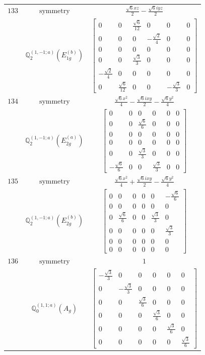 \documentclass[fleqn,8pt,landscape]{jsarticle}
\begin{document}
\begin{longtable}{ccc}
$ 133 $ & $ \text{symmetry} $ & $ \frac{\sqrt{6} x z}{2} - \frac{\sqrt{6} i y z}{2} $ \\
$  $ & $ \mathbb{Q}_{2}^{(1,-1;a)}(E_{1g}^{(b)}) $ & $ \begin{bmatrix} 0 & 0 & \frac{\sqrt{6}}{12} & 0 & 0 & 0 \\ 0 & 0 & 0 & - \frac{\sqrt{2}}{4} & 0 & 0 \\ 0 & 0 & 0 & 0 & 0 & 0 \\ 0 & 0 & \frac{\sqrt{3}}{3} & 0 & 0 & 0 \\ - \frac{\sqrt{2}}{4} & 0 & 0 & 0 & 0 & 0 \\ 0 & \frac{\sqrt{6}}{12} & 0 & 0 & - \frac{\sqrt{3}}{3} & 0 \end{bmatrix} $ \\ \hline
$ 134 $ & $ \text{symmetry} $ & $ \frac{\sqrt{6} x^{2}}{4} - \frac{\sqrt{6} i x y}{2} - \frac{\sqrt{6} y^{2}}{4} $ \\
$  $ & $ \mathbb{Q}_{2}^{(1,-1;a)}(E_{2g}^{(a)}) $ & $ \begin{bmatrix} 0 & 0 & 0 & 0 & 0 & 0 \\ 0 & 0 & \frac{\sqrt{6}}{6} & 0 & 0 & 0 \\ 0 & 0 & 0 & 0 & 0 & 0 \\ 0 & 0 & 0 & 0 & 0 & 0 \\ 0 & 0 & \frac{\sqrt{3}}{3} & 0 & 0 & 0 \\ - \frac{\sqrt{6}}{6} & 0 & 0 & \frac{\sqrt{3}}{3} & 0 & 0 \end{bmatrix} $ \\ \hline
$ 135 $ & $ \text{symmetry} $ & $ \frac{\sqrt{6} x^{2}}{4} + \frac{\sqrt{6} i x y}{2} - \frac{\sqrt{6} y^{2}}{4} $ \\
$  $ & $ \mathbb{Q}_{2}^{(1,-1;a)}(E_{2g}^{(b)}) $ & $ \begin{bmatrix} 0 & 0 & 0 & 0 & 0 & - \frac{\sqrt{6}}{6} \\ 0 & 0 & 0 & 0 & 0 & 0 \\ 0 & \frac{\sqrt{6}}{6} & 0 & 0 & \frac{\sqrt{3}}{3} & 0 \\ 0 & 0 & 0 & 0 & 0 & \frac{\sqrt{3}}{3} \\ 0 & 0 & 0 & 0 & 0 & 0 \\ 0 & 0 & 0 & 0 & 0 & 0 \end{bmatrix} $ \\ \hline
$ 136 $ & $ \text{symmetry} $ & $ 1 $ \\
$  $ & $ \mathbb{Q}_{0}^{(1,1;a)}(A_{g}) $ & $ \begin{bmatrix} - \frac{\sqrt{3}}{3} & 0 & 0 & 0 & 0 & 0 \\ 0 & - \frac{\sqrt{3}}{3} & 0 & 0 & 0 & 0 \\ 0 & 0 & \frac{\sqrt{3}}{6} & 0 & 0 & 0 \\ 0 & 0 & 0 & \frac{\sqrt{3}}{6} & 0 & 0 \\ 0 & 0 & 0 & 0 & \frac{\sqrt{3}}{6} & 0 \\ 0 & 0 & 0 & 0 & 0 & \frac{\sqrt{3}}{6} \end{bmatrix} $ \\ \hline

\end{longtable}
\end{document}
